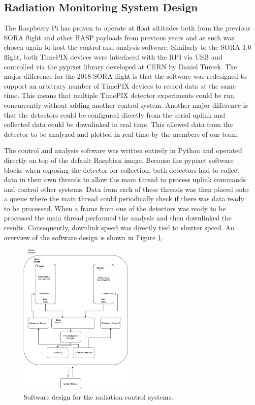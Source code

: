 \subsection{Radiation Monitoring System Design}
\label{sec:Radiation Design}
The Raspberry Pi has proven to operate at float altitudes both from the previous SORA flight and other HASP payloads from previous years and as such was chosen again to host the control and analysis software. Similarly to the SORA 1.0 flight, both TimePIX devices were interfaced with the RPI via USB and controlled via the pypixet library developed at CERN by Daniel Turcek. The major difference for the 2018 SORA flight is that the software was redesigned to support an arbitrary number of TimePIX devices to record data at the same time. This means that multiple TimePIX detector experiments could be run concurrently without adding another control system. Another major difference is that the detectors could be configured directly from the serial uplink and collected data could be downlinked in real time. This allowed data from the detector to be analyzed and plotted in real time by the members of our team.

The control and analysis software was written entirely in Python and operated directly on top of the default Raspbian image. Because the pypixet software blocks when exposing the detector for collection, both detectors had to collect data in their own threads to allow the main thread to process uplink commands and control other systems. Data from each of these threads was then placed onto a queue where the main thread could periodically check if there was data ready to be processed. When a frame from one of the detectors was ready to be processed the main thread performed the analysis and then downlinked the results. Consequently, downlink speed was directly tied to shutter speed. An overview of the software design is shown in 
Figure \ref{fig:softwaredesign}.


\begin{figure}[H]
	\begin{center}
	\includegraphics[width=0.5\textwidth]{figures/SoftwareDesign.pdf}
	\caption{Software design for the radiation control systems.}
	\label{fig:softwaredesign}
	\end{center}
\end{figure}
 
